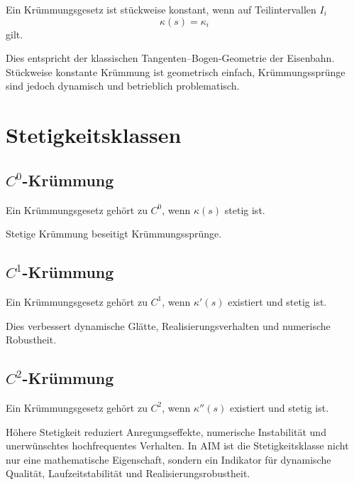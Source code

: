 \begin{definition}
\label{def:piecewise-constant-curvature}
Ein Krümmungsgesetz ist stückweise konstant, wenn auf Teilintervallen \(I_i\)
\[
\kappa(s)=\kappa_i
\]
gilt.
\end{definition}

Dies entspricht der klassischen Tangenten--Bogen-Geometrie der Eisenbahn.
Stückweise konstante Krümmung ist geometrisch einfach, Krümmungssprünge sind
jedoch dynamisch und betrieblich problematisch.

\section{Stetigkeitsklassen}

\subsection{\texorpdfstring{$C^0$}{C0}-Krümmung}
\begin{definition}
\label{def:c0-curvature}
Ein Krümmungsgesetz gehört zu \(C^0\), wenn \(\kappa(s)\) stetig ist.
\end{definition}
Stetige Krümmung beseitigt Krümmungssprünge.

\subsection{\texorpdfstring{$C^1$}{C1}-Krümmung}
\begin{definition}
\label{def:c1-curvature}
Ein Krümmungsgesetz gehört zu \(C^1\), wenn \(\kappa'(s)\) existiert und
stetig ist.
\end{definition}
Dies verbessert dynamische Glätte, Realisierungsverhalten und numerische
Robustheit.

\subsection{\texorpdfstring{$C^2$}{C2}-Krümmung}
\begin{definition}
\label{def:c2-curvature}
Ein Krümmungsgesetz gehört zu \(C^2\), wenn \(\kappa''(s)\) existiert und
stetig ist.
\end{definition}

Höhere Stetigkeit reduziert Anregungseffekte, numerische Instabilität und
unerwünschtes hochfrequentes Verhalten. In AIM ist die Stetigkeitsklasse nicht
nur eine mathematische Eigenschaft, sondern ein Indikator für dynamische
Qualität, Laufzeitstabilität und Realisierungsrobustheit.


